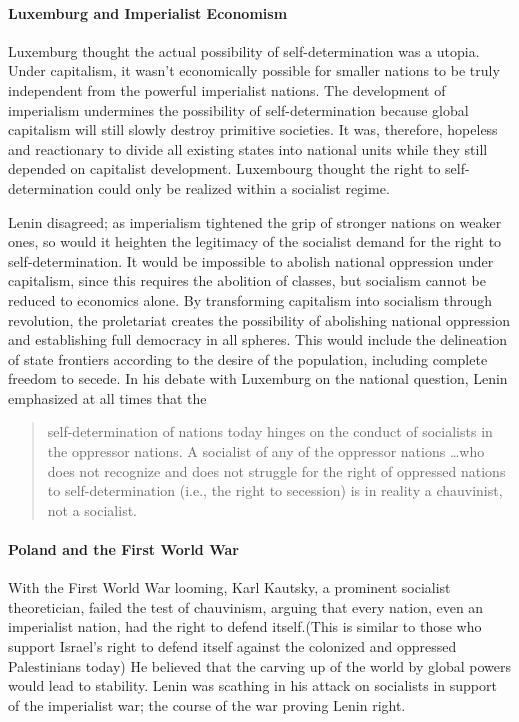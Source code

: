 \paragraph{Luxemburg and Imperialist Economism}

Luxemburg thought the actual possibility of self-determination was a utopia. Under capitalism, it wasn't economically possible for smaller nations to be truly independent from the powerful imperialist nations. The development of imperialism undermines the possibility of self-determination because global capitalism will still slowly destroy primitive societies. It was, therefore, hopeless and reactionary to divide all existing states into national units while they still depended on capitalist development. Luxembourg thought the right to self-determination could only be realized within a socialist regime.

Lenin disagreed; as imperialism tightened the grip of stronger nations on weaker ones, so would it heighten the legitimacy of the socialist demand for the right to self-determination. It would be impossible to abolish national oppression under capitalism, since this requires the abolition of classes, but socialism cannot be reduced to economics alone. By transforming capitalism into socialism through revolution, the proletariat creates the possibility of abolishing national oppression and establishing full democracy in all spheres. This would include the delineation of state frontiers according to the desire of the population, including complete freedom to secede. In his debate with Luxemburg on the national question, Lenin emphasized at all times that the

\blockquote{self-determination of nations today hinges on the conduct of socialists in the oppressor nations. A socialist of any of the oppressor nations \ldots who does not recognize and does not struggle for the right of oppressed nations to self-determination (i.e., the right to secession) is in reality a chauvinist, not a socialist.}

\paragraph{Poland and the First World War}

With the First World War looming, Karl Kautsky, a prominent socialist theoretician, failed the test of chauvinism, arguing that every nation, even an imperialist nation, had the right to defend itself.(This is similar to those who support Israel's right to defend itself against the colonized and oppressed Palestinians today) He believed that the carving up of the world by global powers would lead to stability. Lenin was scathing in his attack on socialists in support of the imperialist war; the course of the war proving Lenin right.


